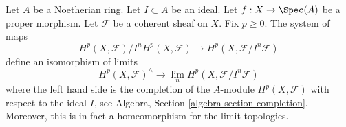 \begin{theorem}
\label{theorem-formal-functions}
Let $A$ be a Noetherian ring.
Let $I \subset A$ be an ideal.
Let $f : X \to \Spec(A)$ be a proper morphism.
Let $\mathcal{F}$ be a coherent sheaf on $X$.
Fix $p \geq 0$.
The system of maps
$$
H^p(X, \mathcal{F})/I^nH^p(X, \mathcal{F})
\longrightarrow
H^p(X, \mathcal{F}/I^n\mathcal{F})
$$
define an isomorphism of limits
$$
H^p(X, \mathcal{F})^\wedge
\longrightarrow
\lim_n H^p(X, \mathcal{F}/I^n\mathcal{F})
$$
where the left hand side is the completion of the $A$-module
$H^p(X, \mathcal{F})$ with respect to the ideal $I$, see
Algebra, Section \ref{algebra-section-completion}.
Moreover, this is in fact a homeomorphism for the limit topologies.
\end{theorem}